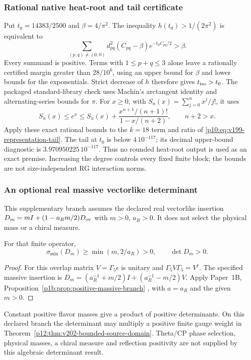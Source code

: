 \documentclass[12pt,a4paper]{article}
\begin{document}
\subsubsection{Rational native heat-root and tail certificate}
\label{p10:app:v202-native-heat-certificate}
Put $t_0=14383/2500$ and $\beta=4/\pi^2$. The inequality
$h(t_0)>1/(2\pi^2)$ is equivalent to
\[
 \sum_{(p,q)\ne(0,0)}d_{pq}^2(C_{pq}-\beta)e^{-t_0C_{pq}/2}>\beta.
\]
Every summand is positive. Terms with $1\le p+q\le3$ alone leave a
rationally certified margin greater than $28/10^6$, using an upper bound
for $\beta$ and lower bounds for the exponentials. Strict decrease of
$h$ therefore gives $t_{\rm iso}>t_0$. The packaged standard-library
check uses Machin's arctangent identity and alternating-series bounds for
$\pi$. For $x\ge0$, with $S_n(x)=\sum_{j=0}^nx^j/j!$, it uses
\[
 S_n(x)\le e^x\le S_n(x)+
 \frac{x^{n+1}/(n+1)!}{1-x/(n+2)},\qquad n+2>x.
\]
Apply these exact rational bounds to the $k=18$ term and ratio of
\eqref{p10:eq:v199-representation-tail}. The tail at $t_0$ is below
$4\,10^{-117}$; its decimal upper-bound diagnostic is
$3.970950225\,10^{-117}$. Thus no rounded heat-root output is used as
an exact premise. Increasing the degree controls every fixed finite
block; the bounds are not size-independent RG interaction norms.


\subsubsection{An optional real massive vectorlike determinant}
\label{p10:app:v202-vectorlike}
This supplementary branch assumes the declared real vectorlike insertion
$D_m=mI+(1-a_Rm/2)D_{\rm ov}$ with $m>0$, $a_R>0$. It does not
select the physical mass or a chiral measure.
\begin{proposition}
\label{p10:prop:v202-vectorlike-positive}
For that finite operator,
\[
 \sigma_{\min}(D_m)\ge\min(m,2/a_R)>0,\qquad \det D_m>0.
\]
\end{proposition}
\begin{proof}
For this overlap matrix $V=\Gamma_5\epsilon$ is unitary and
$\Gamma_5V\Gamma_5=V^\dagger$. The specified massive insertion is
$D_m=(a_R^{-1}+m/2)I+(a_R^{-1}-m/2)V$. Apply Paper~1B,
Proposition~\ref{p1b:prop:positive-massive-branch}
\cite{Kugelmann2026Paper1B}, with $a=a_R$ and the given $m>0$.
\end{proof}
Constant positive flavor masses give a product of positive determinants.
On this declared branch the determinant may multiply a positive finite
gauge weight in Theorem~\ref{p12:thm:v202-bounded-source-domain}.
Theta/CP phase selection, physical masses, a chiral measure and reflection
positivity are not supplied by this algebraic determinant result.
\end{document}
